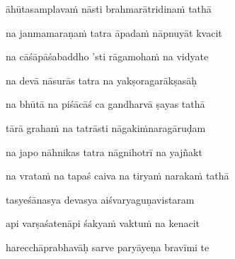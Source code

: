 āhūtasamplavaṁ nāsti brahmarātridinaṁ tathā\thinspace{\dandab} \dontdisplaylinenum
{}

na janmamaraṇaṁ tatra āpadaṁ nāpnuyāt kvacit \veg\dontdisplaylinenum
{}

na cāśāpāśabaddho 'sti rāgamohaṁ na vidyate\thinspace{\dandab} \dontdisplaylinenum
{}

na devā nāsurās tatra na yakṣoragarākṣasāḥ \veg\dontdisplaylinenum
{}

na bhūtā na piśācāś ca gandharvā ṣayas tathā\thinspace{\dandab} \dontdisplaylinenum
{}

tārā grahaṁ na tatrāsti nāgakiṁnaragāruḍam \veg\dontdisplaylinenum

na japo nāhnikas tatra nāgnihotrī na yajñakt\thinspace{\dandab} \dontdisplaylinenum
{}

na vrataṁ na tapaś caiva na tiryaṁ narakaṁ tathā \veg\dontdisplaylinenum

tasyeśānasya devasya aiśvaryaguṇavistaram\thinspace{\dandab} \dontdisplaylinenum

api varṣaśatenāpi śakyaṁ vaktuṁ na kenacit \veg\dontdisplaylinenum

harecchāprabhavāḥ sarve paryāyeṇa bravīmi te\thinspace{\dandab} \dontdisplaylinenum
{}

